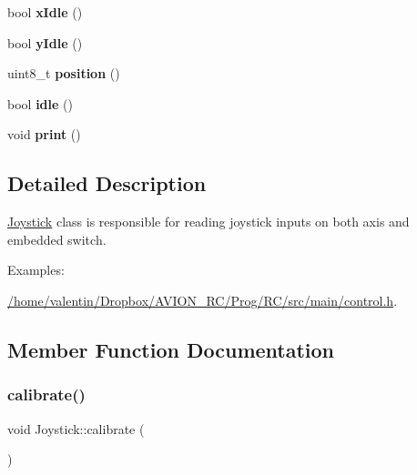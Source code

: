 \begin{DoxyCompactItemize}
\item 
\mbox{\label{class_joystick_a12b4e2601b66e1607c77c52364e96adc}} 
bool {\bfseries x\+Idle} ()
\item 
\mbox{\label{class_joystick_a02261229db91dab161af9744cc6ff81d}} 
bool {\bfseries y\+Idle} ()
\item 
\mbox{\label{class_joystick_af385438f23a6ed41ad3942ea1f9bf605}} 
uint8\+\_\+t {\bfseries position} ()
\item 
\mbox{\label{class_joystick_a5a2f4443f0b0e44f328bea0137e023dd}} 
bool {\bfseries idle} ()
\item 
\mbox{\label{class_joystick_afd789cfd5832facccafa3784c8016b16}} 
void {\bfseries print} ()
\end{DoxyCompactItemize}


\subsection{Detailed Description}
\hyperlink{class_joystick}{Joystick} class is responsible for reading joystick inputs on both axis and embedded switch. \begin{Desc}
\item[Examples\+: ]\par
\hyperlink{_2home_2valentin_2_dropbox_2_a_v_i_o_n__r_c_2_prog_2_r_c_2src_2main_2control_8h-example}{/home/valentin/\+Dropbox/\+A\+V\+I\+O\+N\+\_\+\+R\+C/\+Prog/\+R\+C/src/main/control.\+h}.\end{Desc}


\subsection{Member Function Documentation}
\mbox{\label{class_joystick_ae2a8edfcf0aa98fba3e4bfb31ebc8200}} 
\subsubsection{\texorpdfstring{calibrate()}{calibrate()}}
{\footnotesize\ttfamily void Joystick\+::calibrate (\begin{DoxyParamCaption}{ }\end{DoxyParamCaption})}



